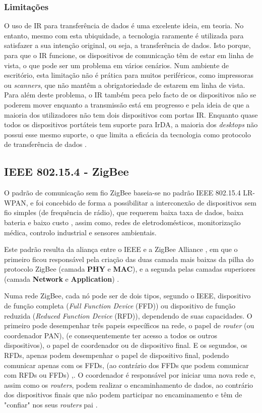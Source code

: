\documentclass[conference]{IEEEtran}
\begin{document}
\subsubsection{Limitações}

O uso de IR para transferência de dados é uma excelente ideia, em teoria. 
No entanto, mesmo com esta ubiquidade, a tecnologia raramente é utilizada para satisfazer a sua intenção original, ou seja, a transferência de dados. 
Isto porque, para que o IR funcione, os dispositivos de comunicação têm de estar em linha de vista, o que pode ser um problema em vários cenários. 
Num ambiente de escritório, esta limitação não é prática para muitos periféricos, como impressoras ou \textit{scanners}, que não mantêm a obrigatoriedade de estarem em linha de vista. 
Para além deste problema, o IR também peca pelo facto de os dispositivos não se poderem mover enquanto a transmissão está em progresso e pela ideia de que a maioria dos utilizadores não tem dois dispositivos com portas IR. 
Enquanto quase todos os dispositivos portáteis tem suporte para IrDA, a maioria dos \textit{desktops} não possui esse mesmo suporte, o que limita a eficácia da tecnologia como protocolo de transferência de dados \cite{wpanonline}.


\subsection{IEEE 802.15.4 - ZigBee}

O padrão de comunicação sem fio ZigBee baseia-se no padrão IEEE 802.15.4 LR-WPAN, e foi concebido de forma a possibilitar a interconexão de dispositivos sem fio simples (de frequência de rádio), que requerem baixa taxa de dados, baixa bateria e baixo custo \cite{kennedy2008review}, assim como, redes de eletrodomésticos, monitorização médica, controlo industrial e sensores ambientais.

Este padrão resulta da aliança entre o IEEE e a ZigBee Alliance , em que o primeiro ficou responsável pela criação das duas camada mais baixas da pilha do protocolo ZigBee (camada \textbf{PHY} e \textbf{MAC}), e a segunda pelas camadas superiores (camada \textbf{Network} e \textbf{Application}) \cite{liang2006impact}.

Numa rede ZigBee, cada nó pode ser de dois tipos, segundo o IEEE, dispositivo de função completa (\textit{Full Function Device} (FFD)) ou dispositivo de função reduzida (\textit{Reduced Function Device} (RFD)), dependendo de suas capacidades.
O primeiro pode desempenhar três papeis específicos na rede, o papel de \textit{router} (ou coordenador PAN), (e consequentemente ter acesso a todos os outros dispositivos), o papel de coordenador ou de dispositivo final.
E os segundos, os RFDs, apenas podem desempenhar o papel de dispositivo final, podendo comunicar apenas com os FFDs, (ao contrário dos FFDs que podem comunicar com RFDs ou FFDs) \cite{liang2006impact},\cite{sinem2004zigbee}.
O coordenador é responsável por iniciar uma nova rede e, assim como os \textit{routers}, podem realizar o encaminhamento de dados, ao contrário dos dispositivos finais que não podem participar no encaminamento e têm de "confiar" nos seus \textit{routers} pai \cite{liang2006impact}.
\end{document}
